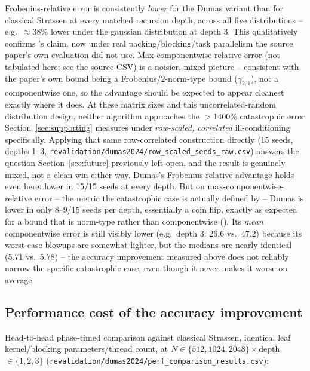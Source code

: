 \documentclass[acmsmall]{acmart}
\begin{document}
Frobenius-relative error is consistently \emph{lower} for the Dumas
variant than for classical Strassen at every matched recursion depth,
across all five distributions -- e.g.\ $\approx$38\% lower under the
gaussian distribution at depth 3. This qualitatively confirms
\cite{dumas2024strassen}'s claim, now under real packing/blocking/task
parallelism the source paper's own evaluation did not use.
Max-componentwise-relative error (not tabulated here; see the source
CSV) is a noisier, mixed picture -- consistent with the paper's own
bound being a Frobenius/2-norm-type bound ($\gamma_{2,1}$), not a
componentwise one, so the advantage should be expected to appear
cleanest exactly where it does. At these matrix sizes and this
uncorrelated-random distribution design, neither algorithm approaches
the $>$1400\% catastrophic error Section~\ref{sec:supporting} measures
under \emph{row-scaled, correlated} ill-conditioning specifically.
Applying that same row-correlated construction directly (15 seeds,
depths 1--3, \texttt{revalidation/dumas2024/row\_scaled\_seeds\_raw.csv})
answers the question Section~\ref{sec:future} previously left open, and
the result is genuinely mixed, not a clean win either way. Dumas's
Frobenius-relative advantage holds even here: lower in 15/15 seeds at
every depth. But on max-componentwise-relative error -- the metric the
catastrophic case is actually defined by -- Dumas is lower in only
8--9/15 seeds per depth, essentially a coin flip, exactly as expected
for a bound that is norm-type rather than componentwise
(\cite{higham1990exploiting,ballard2016improving}). Its \emph{mean}
componentwise error is still visibly lower (e.g.\ depth 3: 26.6 vs.\
47.2) because its worst-case blowups are somewhat lighter, but the
medians are nearly identical (5.71 vs.\ 5.78) -- the accuracy
improvement measured above does not reliably narrow the specific
catastrophic case, even though it never makes it worse on average.

\subsection{Performance cost of the accuracy improvement}
\label{sec:dumas-perf}
Head-to-head phase-timed comparison against classical Strassen,
identical leaf kernel/blocking parameters/thread count, at
$N\in\{512,1024,2048\}\times$depth$\in\{1,2,3\}$
(\texttt{revalidation/dumas2024/perf\_comparison\_results.csv}):
\end{document}
